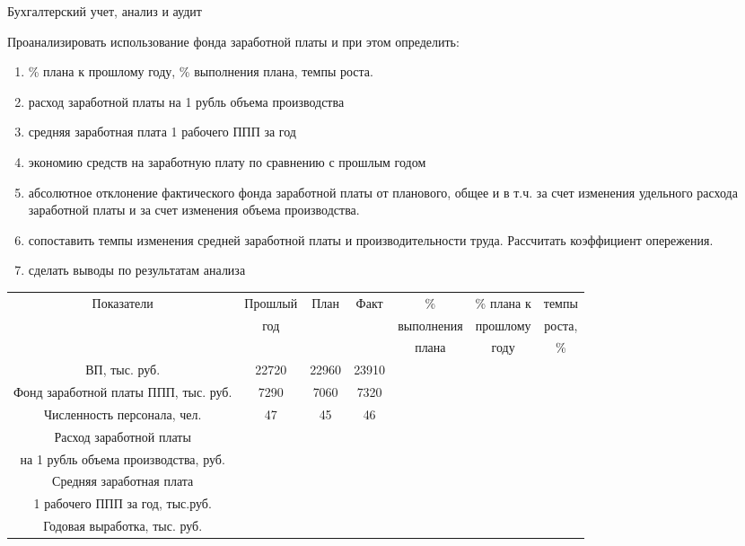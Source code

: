\documentclass[
	11pt,
	a4paper,
	]
	{article}
\begin{document}
 {Бухгалтерский учет, анализ и аудит}
\prGE

	Проанализировать использование фонда заработной платы и при этом определить:

\begin{enumerate}
	\item \% плана к прошлому году, \% выполнения плана, темпы роста.
	\item расход заработной платы на 1 рубль объема производства
	\item средняя заработная плата 1 рабочего ППП за год
	\item экономию средств на заработную плату по сравнению с прошлым годом
	\item абсолютное отклонение фактического фонда заработной платы от планового, общее и в т.ч. за счет изменения удельного расхода заработной платы и за счет изменения объема производства.
	\item сопоставить темпы изменения средней заработной платы и производительности труда. Рассчитать коэффициент опережения.
	\item сделать выводы по результатам анализа
\end{enumerate}

\begin{table}[ht!]\centering
\begin{tabular}{|*{7}{c|}}
\hline
Показатели 	& Прошлый & План & Факт & \% 					& \% плана к & темпы \\
						& год 		& 		 & 			& выполнения	& прошлому 	 & роста,\\
						&					&			 &			& плана 			& году			 & \%
\\ \hline
ВП, тыс. руб. & 22720 & 22960 & 23910 & & & \\ \hline
Фонд заработной платы ППП, тыс. руб. & 7290 & 7060 & 7320 & & & \\ \hline
Численность персонала, чел. & 47 & 45 & 46 & & & \\ \hline
Расход заработной платы  & & & & & & \\
	на 1 рубль объема производства, руб. & & & & & & \\ \hline
Средняя заработная плата  & & & & & & \\
	1 рабочего ППП за год, тыс.руб.  & & & & & & \\ \hline
Годовая выработка, тыс. руб. & & & & & & \\ \hline
\end{tabular}
\end{table}
\end{document}
